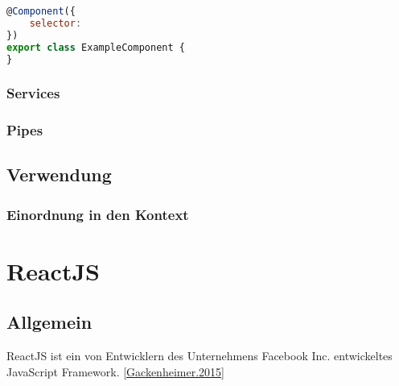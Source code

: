 \begin{lstlisting}[caption=Implementierung einer Komponente, label=Angular-Komponente, title=Implementierung einer Komponente,language=JavaScript]
@Component({
	selector: 
})
export class ExampleComponent {
}
\end{lstlisting}



\subsubsection{Services}


\subsubsection{Pipes} 





\subsection{Verwendung}

\subsubsection{Einordnung in den Kontext}


\section{ReactJS}

\subsection{Allgemein}


ReactJS ist ein von Entwicklern des Unternehmens Facebook Inc. entwickeltes JavaScript Framework. \autoref{Gackenheimer.2015} 


%



